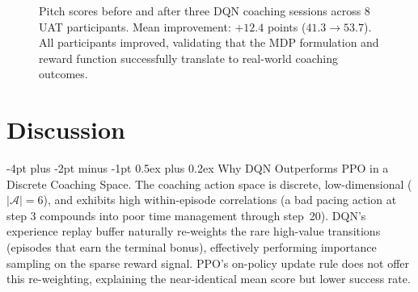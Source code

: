\documentclass{article}
\makeatletter
\renewcommand\paragraph{\@startsection{paragraph}{4}{\z@}%
  {-4pt plus -2pt minus -1pt}%
  {0.5ex plus 0.2ex}%
  {\normalsize\bf}}
\makeatother
\begin{document}
\begin{figure}[htbp]
\centering
{}
\caption{Pitch scores before and after three DQN coaching sessions
         across 8 UAT participants. Mean improvement: $+12.4$ points
         ($41.3 \to 53.7$). All participants improved, validating that
         the MDP formulation and reward function successfully translate
         to real-world coaching outcomes.}
\label{fig:before_after}
\end{figure}


\FloatBarrier
\section{Discussion}

\paragraph{Why DQN Outperforms PPO in a Discrete Coaching Space.}
The coaching action space is discrete, low-dimensional ($|\mathcal{A}|=6$),
and exhibits high within-episode correlations (a bad pacing action at step 3
compounds into poor time management through step~20).
DQN's experience replay buffer naturally re-weights the rare high-value
transitions (episodes that earn the terminal bonus), effectively performing
importance sampling on the sparse reward signal. PPO's on-policy update
rule does not offer this re-weighting, explaining the near-identical mean
score but lower success rate.
\end{document}
